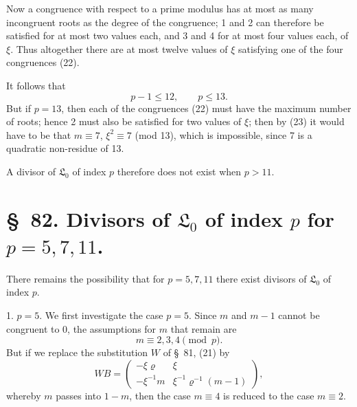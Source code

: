 \documentclass[11pt]{article}
\providecommand{\Lzero}{\mathfrak L_0}
\begin{document}
Now a congruence with respect to a prime modulus has at most as many incongruent roots as the degree of the congruence; 1 and 2 can therefore be satisfied for at most two values each, and 3 and 4 for at most four values each, of $\xi$. Thus altogether there are at most twelve values of $\xi$ satisfying one of the four congruences (22).

It follows that
\[
 p-1\leq12,\qquad p\leq13.
\]
But if $p=13$, then each of the congruences (22) must have the maximum number of roots; hence 2 must also be satisfied for two values of $\xi$; then by (23) it would have to be that $m\equiv7$, $\xi^2\equiv7$ (mod 13), which is impossible, since 7 is a quadratic non-residue of 13.

A divisor of $\Lzero$ of index $p$ therefore does not exist when $p>11$.

\section*{\S~82. Divisors of $\Lzero$ of index $p$ for $p=5,7,11$.}

There remains the possibility that for $p=5,7,11$ there exist divisors of $\Lzero$ of index $p$.

1. $p=5$. We first investigate the case $p=5$. Since $m$ and $m-1$ cannot be congruent to $0$, the assumptions for $m$ that remain are
\[
 m\equiv2,3,4\pmod p.
\]
But if we replace the substitution $W$ of \S~81, (21) by
\begin{equation}
 WB=\begin{pmatrix}
 -\xi\varrho & \xi\\
 -\xi^{-1}m & \xi^{-1}\varrho^{-1}(m-1)
 \end{pmatrix},
\tag{1}
\end{equation}
whereby $m$ passes into $1-m$, then the case $m\equiv4$ is reduced to the case $m\equiv2$.
\end{document}
